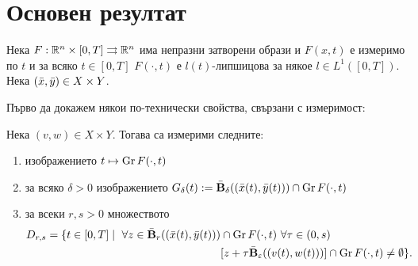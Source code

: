 \chapter{Основен резултат}

Нека $F:\mathbb{R}^n\times [0,T]\rightrightarrows \mathbb{R}^n$ има непразни затворени образи и $F(x,t)$ е измеримо по $t$ и за всяко $t\in [0,T]$ $F(\cdot, t)$ е $l(t)$-липшицова за някое $l\in L^1([0,T])$.
Нека $(\bar{x},\bar{y})\in X\times Y$.

Първо да докажем някои по-технически свойства, свързани с измеримост:
\begin{lemma}
    Нека $(v,w)\in X\times Y$. Тогава са измерими следните:
    \begin{enumerate}
        \item изображението $t \mapsto \operatorname{Gr} F(\cdot, t)$
        \item за всяко $\delta > 0$ изображението $G_{\delta}(t) := \bar{\textbf{B}}_{\delta}((\bar{x}(t),\bar{y}(t)))\cap\operatorname{Gr} F(\cdot, t)$
        \item за всеки $r,s > 0$ множеството
            \begin{align*}
                D_{r,s} = \{t\in [0,T]\mid\ \forall z\in\bar{\textbf{B}}_{r}((\bar{x}(t),\bar{y}(t)))&\cap\operatorname{Gr} F(\cdot, t)\ \forall \tau\in(0,s)\\
                  &[z + \tau \bar{\textbf{B}}_{\varepsilon}((v(t),w(t)))]\cap\operatorname{Gr} F(\cdot, t)\neq\emptyset\}.
            \end{align*}
    \end{enumerate}
\end{lemma}
